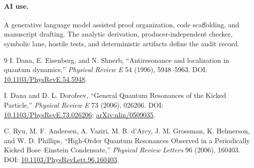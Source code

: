 \documentclass[10pt]{article}
\begin{document}
\paragraph{AI use.}
A generative language model assisted proof organization, code scaffolding,
and manuscript drafting.  The analytic derivation, producer-independent
checker, symbolic lane, hostile tests, and deterministic artifacts define
the audit record.
\fi

\begingroup
\small
\begin{thebibliography}{9}
I. Dana, E. Eisenberg, and N. Shnerb,
``Antiresonance and localization in quantum dynamics,''
\emph{Physical Review E} 54 (1996), 5948--5963.
DOI: \href{https://doi.org/10.1103/PhysRevE.54.5948}%
{10.1103/PhysRevE.54.5948}.

I. Dana and D. L. Dorofeev,
``General Quantum Resonances of the Kicked Particle,''
\emph{Physical Review E} 73 (2006), 026206.
DOI: \href{https://doi.org/10.1103/PhysRevE.73.026206}%
{10.1103/PhysRevE.73.026206};
\href{https://arxiv.org/abs/nlin/0509035}{arXiv:nlin/0509035}.

C. Ryu, M. F. Andersen, A. Vaziri, M. B. d'Arcy, J. M. Grossman,
K. Helmerson, and W. D. Phillips,
``High-Order Quantum Resonances Observed in a Periodically Kicked
Bose--Einstein Condensate,''
\emph{Physical Review Letters} 96 (2006), 160403.
DOI: \href{https://doi.org/10.1103/PhysRevLett.96.160403}%
{10.1103/PhysRevLett.96.160403}.
\end{thebibliography}
\endgroup
\end{document}
